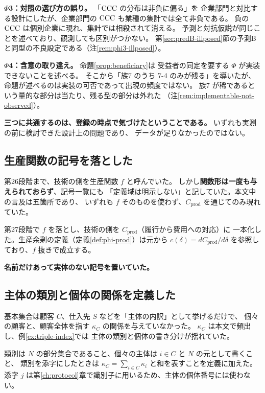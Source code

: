 \textbf{$\Phi$3：対照の選び方の誤り。} 「$\mathrm{CCC}$ の分布は非負に偏る」を
企業部門と対比する設計にしたが、企業部門の $\mathrm{CCC}$ も業種の集計では全て非負である。
負の $\mathrm{CCC}$ は個別企業に現れ、集計では相殺されて消える。
予測と対抗仮説が同じことを述べており、観測しても区別がつかない。
第\ref{sec:predB-illposed}節の予測Bと同型の不良設定である（注\ref{rem:phi3-illposed}）。

\textbf{$\Phi$4：含意の取り違え。} 命題\ref{prop:beneficiary}は
受益者の同定を要する $\Phi$ が実装できないことを述べる。
そこから「族7 のうち 7-4 のみが残る」を導いたが、
命題が述べるのは実装の可否であって出現の頻度ではない。
族7 が稀であるという量的な部分は当たり、残る型の部分は外れた
（注\ref{rem:implementable-not-observed}）。

\textbf{三つに共通するのは、登録の時点で気づけたということである。}
いずれも実測の前に検討できた設計上の問題であり、
データが足りなかったのではない。

\subsection{生産関数の記号を落とした}
\label{sec:drop-f}

第26段階まで、技術の側を生産関数 $f$ と呼んでいた。
しかし\textbf{関数形は一度も与えられておらず}、記号一覧にも
「定義域は明示しない」と記していた。本文中の言及は五箇所であり、
いずれも $f$ そのものを使わず、$C_{\mathrm{prod}}$ を通じてのみ現れていた。

第27段階で $f$ を落とし、技術の側を $C_{\mathrm{prod}}$（履行から費用への対応）に
一本化した。生産余剰の定義（定義\ref{def:phi-prod}）は元から
$c(\delta)=dC_{\mathrm{prod}}/d\delta$ を参照しており、$f$ 抜きで成立する。

\textbf{名前だけあって実体のない記号を置いていた。}

\subsection{主体の類別と個体の関係を定義した}

基本集合は顧客 $C$、仕入先 $S$ などを「主体の内訳」として挙げるだけで、
個々の顧客と、顧客全体を指す $\kappa_C$ の関係を与えていなかった。
$\kappa_C$ は本文で頻出し、例\ref{ex:triple-index}では
主体の類別と個体の書き分けが揺れていた。

類別は $N$ の部分集合であること、個々の主体は $i\in C$ と $N$ の元として書くこと、
類別を添字にしたときは $\kappa_C=\sum_{i\in C}\kappa_i$ と和を表すことを定義に加えた。
添字 $j$ は第\ref{ch:protocol}章で識別子に用いるため、主体の個体番号には使わない。


